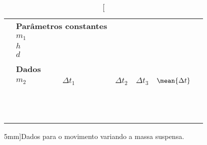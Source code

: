 \vspace{1cm}
\begin{table*}[!hb]
\centering
\begin{tabular}{lp{25mm}p{25mm}p{25mm}p{25mm}p{25mm}l}
\toprule
	& \multicolumn{2}{l}{\textbf{Parâmetros constantes}} & \\
	\cmidrule{2-3}
	& $m_1$ \cellcolor[gray]{0.89} & \cellcolor[gray]{0.92} \\
	& $h$ \cellcolor[gray]{0.95} & \cellcolor[gray]{0.97} \\
	& $d$ \cellcolor[gray]{0.89} & \cellcolor[gray]{0.92} \\
	\cmidrule{2-3}
\\
	& \multicolumn{2}{l}{\textbf{Dados}} \\
	\cmidrule{2-6}
	& $m_2$ & $\Delta t_1$ & $\Delta t_2$ & $\Delta t_3$ & $\mean{\Delta t}$ &\\
	\cmidrule{2-6}
	& \cellcolor[gray]{0.89} & \cellcolor[gray]{0.92} & \cellcolor[gray]{0.89} & \cellcolor[gray]{0.92} & \cellcolor[gray]{0.89} \\
	& \cellcolor[gray]{0.95} & \cellcolor[gray]{0.97} & \cellcolor[gray]{0.95} & \cellcolor[gray]{0.97} & \cellcolor[gray]{0.95} \\
		& \cellcolor[gray]{0.89} & \cellcolor[gray]{0.92} & \cellcolor[gray]{0.89} & \cellcolor[gray]{0.92} & \cellcolor[gray]{0.89} \\
	& \cellcolor[gray]{0.95} & \cellcolor[gray]{0.97} & \cellcolor[gray]{0.95} & \cellcolor[gray]{0.97} & \cellcolor[gray]{0.95} \\
		& \cellcolor[gray]{0.89} & \cellcolor[gray]{0.92} & \cellcolor[gray]{0.89} & \cellcolor[gray]{0.92} & \cellcolor[gray]{0.89} \\
	& \cellcolor[gray]{0.95} & \cellcolor[gray]{0.97} & \cellcolor[gray]{0.95} & \cellcolor[gray]{0.97} & \cellcolor[gray]{0.95} \\
		& \cellcolor[gray]{0.89} & \cellcolor[gray]{0.92} & \cellcolor[gray]{0.89} & \cellcolor[gray]{0.92} & \cellcolor[gray]{0.89} \\
	& \cellcolor[gray]{0.95} & \cellcolor[gray]{0.97} & \cellcolor[gray]{0.95} & \cellcolor[gray]{0.97} & \cellcolor[gray]{0.95} \\
		& \cellcolor[gray]{0.89} & \cellcolor[gray]{0.92} & \cellcolor[gray]{0.89} & \cellcolor[gray]{0.92} & \cellcolor[gray]{0.89} \\
	& \cellcolor[gray]{0.95} & \cellcolor[gray]{0.97} & \cellcolor[gray]{0.95} & \cellcolor[gray]{0.97} & \cellcolor[gray]{0.95} \\
		& \cellcolor[gray]{0.89} & \cellcolor[gray]{0.92} & \cellcolor[gray]{0.89} & \cellcolor[gray]{0.92} & \cellcolor[gray]{0.89} \\
	& \cellcolor[gray]{0.95} & \cellcolor[gray]{0.97} & \cellcolor[gray]{0.95} & \cellcolor[gray]{0.97} & \cellcolor[gray]{0.95} \\
	\cmidrule{2-6}
\bottomrule
\end{tabular}
\caption[][5mm]{Dados para o movimento variando a massa suspensa.}
\label{TabelaDadosEnergiaMecanica2}
\end{table*}

